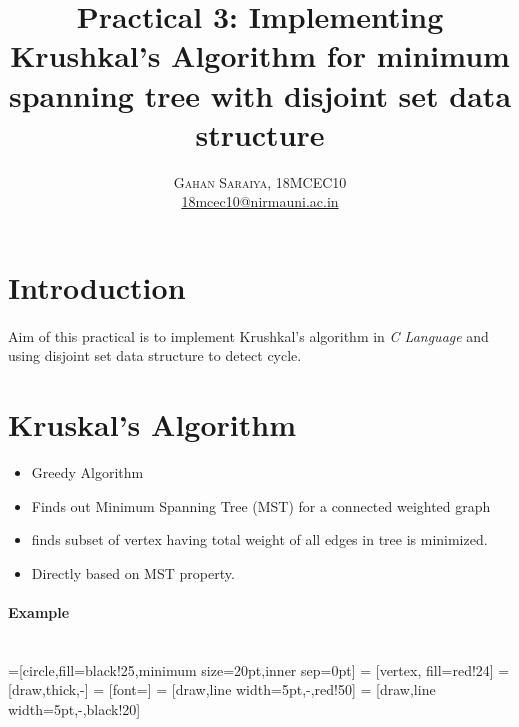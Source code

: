 \documentclass[paper=letter, fontsize=12pt]{article}
\title{\vspace{-15mm}\fontsize{24pt}{10pt}\selectfont\textbf{Practical 3: Implementing Krushkal's Algorithm for minimum spanning tree with disjoint set data structure}} %
\author{
\large
{\textsc{Gahan Saraiya, 18MCEC10 }}\\[2mm]
\normalsize \href{mailto:18mcec10@nirmauni.ac.in}{18mcec10@nirmauni.ac.in}\\[2mm] %
}
\date{}
\begin{document}
\maketitle %
\thispagestyle{fancy} %

\newcommand*\tick{\item[\Checkmark]}
\newcommand*\arrow{\item[$\Rightarrow$]}
\newcommand*\fail{\item[\XSolidBrush]}

\section{Introduction}
\paragraph{}
Aim of this practical is to implement Krushkal's algorithm in \textit{C Language} and using disjoint set data structure to detect cycle.

\section{Kruskal's Algorithm}
\begin{itemize}
	\item Greedy Algorithm
	\item Finds out Minimum Spanning Tree (MST) for a connected weighted graph
	\item finds subset of vertex having total weight of all edges in tree is minimized.
	\item Directly based on MST property.
\end{itemize}
\paragraph{Example}\\%
=[circle,fill=black!25,minimum size=20pt,inner sep=0pt]
 = [vertex, fill=red!24]
 = [draw,thick,-]
 = [font=\small]
 = [draw,line width=5pt,-,red!50]
 = [draw,line width=5pt,-,black!20]
\end{document}
